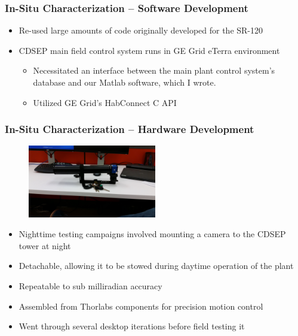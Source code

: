 \documentclass[aspectratio=169]{beamer}
\begin{document}
\begin{frame}
  \frametitle{In-Situ Characterization -- Software Development}
  \begin{itemize}
  \item Re-used large amounts of code originally developed for the SR-120
  \item CDSEP main field control system runs in GE Grid eTerra environment
    \begin{itemize}
    \item Necessitated an interface between the main plant control system's database and our Matlab software, which I wrote.
    \item Utilized GE Grid's HabConnect C API
    \end{itemize}
  \end{itemize}
\end{frame}

\begin{frame}
  \frametitle{In-Situ Characterization -- Hardware Development}
  \begin{figure}
    \includegraphics[width=0.5\textwidth]{CameraMount.jpg}
  \end{figure}
  \begin{itemize}
  \item Nighttime testing campaigns involved mounting a camera to the
    CDSEP tower at night
  \item Detachable, allowing it to be stowed during daytime operation of the plant
  \item Repeatable to sub milliradian accuracy
  \item Assembled from Thorlabs components for precision motion control
  \item Went through several desktop iterations before field testing it
  \end{itemize}
\end{frame}
\end{document}
